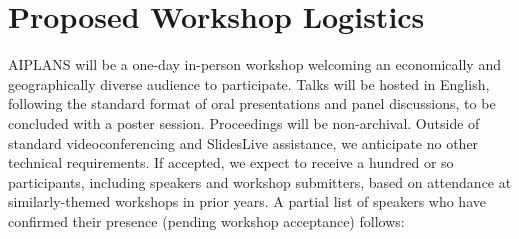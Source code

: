 \documentclass{article}
\begin{document}





    \section*{Proposed Workshop Logistics}

    AIPLANS will be a one-day in-person workshop welcoming an economically and geographically diverse audience to participate. Talks will be hosted in English, following the standard format of oral presentations and panel discussions, to be concluded with a poster session. Proceedings will be non-archival. Outside of standard videoconferencing and SlidesLive assistance, we anticipate no other technical requirements. If accepted, we expect to receive a hundred or so participants, including speakers and workshop submitters, based on attendance at similarly-themed workshops in prior years. A partial list of speakers who have confirmed their presence (pending workshop acceptance) follows:

\end{document}
